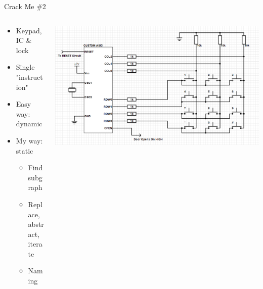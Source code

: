 \documentclass[10pt, compress]{beamer}
\begin{document}
\begin{frame}{Crack Me \#2}
\begin{columns}
		\begin{column}{0.5\textwidth}
	\begin{itemize}
	\item Keypad, IC \& lock
	\item Single "instruction"
	\item Easy way: dynamic
	\item My way: static
		\begin{itemize}
		\item Find subgraph
		\item Replace, abstract, iterate
		\item Naming
		\end{itemize}
	\end{itemize}
	\end{column}
		\begin{column}{0.5\textwidth}
			\includegraphics[width=1\textwidth]{images/schematic.png}
		\end{column}
	\end{columns}
\end{frame}
\end{document}
